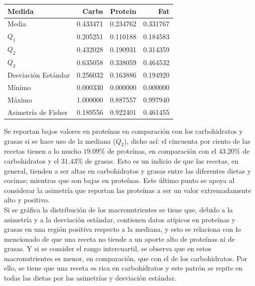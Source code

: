 \documentclass[12pt,a4paper]{article}
\begin{document}
{{            \begin{center}
                \begin{tabular}{l|rrr}
                \toprule
                    Medida & Carbs & Protein & Fat \\  
                \midrule
                    Media               & 0.433471 & 0.234762 & 0.331767 \\
                    $Q_1$               & 0.205251 & 0.110188 & 0.184583 \\
                    $Q_2$               & 0.432028 & 0.190931 & 0.314359 \\
                    $Q_3$               & 0.635058 & 0.338059 & 0.464532 \\
                    Desviación Estándar & 0.256032 & 0.163886 & 0.194920 \\
                    Mínimo              & 0.000330 & 0.000000 & 0.000000 \\
                    Máximo              & 1.000000 & 0.887557 & 0.997940 \\
                    Asimetría de Fisher & 0.189556 & 0.922401 & 0.461455 \\
                \bottomrule
                \end{tabular}
            \end{center}

            Se reportan bajos valores en proteínas en comparación 
            con los carbohidratos y grasas si se hace uso de la mediana ($Q_2$), 
            dicho así: el cincuenta por ciento de las recetas tienen a lo mucho  
            $19.09\%$ de proteínas, en comparación con el $43.20\%$ de carbohidratos 
            y el $31.43\%$ de grasas. Esto es un indicio de que las recetas, en general, 
            tienden a ser altas en carbohidratos y grasas entre las diferentes dietas y 
            cocinas; mientras que son bajas en proteínas. Este último punto se apoya 
            al considerar la asimetría que reportan las proteínas a ser un valor extremadamente 
            alto y positivo.\\

            Si se gráfica la distribución de los macronutrientes se tiene que, debido 
            a la asimetría y a la desviación estándar, contienen datos atípicos en proteínas 
            y grasas en una región positiva respecto a la mediana, y esto se relaciona con 
            lo mencionado de que una receta no tiende a un aporte alto de proteínas ni de grasas. 
            Y si se consider el rango intercuartil, se observa que en estos macronutrientes es 
            menor, en comparación, que con el de los carbohidratos. Por ello, se tiene que 
            una receta es rica en carbohidratos y este patrón se repite en todas las dietas 
            por las asimetrías y desviación estándar.

}}
\end{document}
